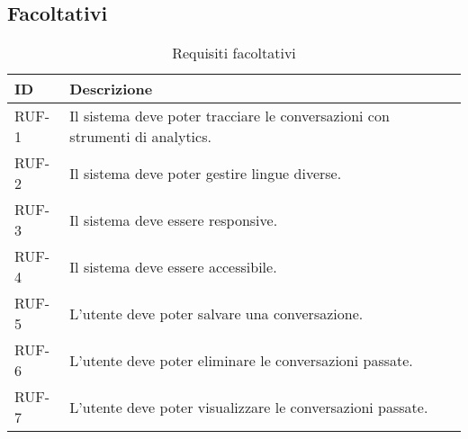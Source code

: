 \subsection{Facoltativi}

\begin{table}[H]
    \centering
    \caption{Requisiti facoltativi}
    \label{tab:requisiti-facoltativi}
    \begin{tabularx}{\textwidth}{|p{}|>{\raggedright\arraybackslash}X|}
        \hline
        \textbf{ID} & \textbf{Descrizione} \\
        \hline
        RUF-1\label{ru:RUF-1} & Il sistema deve poter tracciare le conversazioni con strumenti di analytics. \\
        \hline
        RUF-2\label{ru:RUF-2} & Il sistema deve poter gestire lingue diverse. \\
        \hline
        RUF-3\label{ru:RUF-3} & Il sistema deve essere responsive. \\
        \hline
        RUF-4\label{ru:RUF-4} & Il sistema deve essere accessibile. \\
        \hline
        RUF-5\label{ru:RUF-5} & L'utente deve poter salvare una conversazione. \\
        \hline
        RUF-6\label{ru:RUF-6} & L'utente deve poter eliminare le conversazioni passate. \\
        \hline
        RUF-7\label{ru:RUF-7} & L'utente deve poter visualizzare le conversazioni passate. \\
        \hline
    \end{tabularx}
\end{table}


